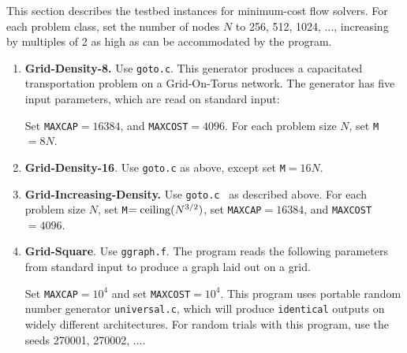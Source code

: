 This section describes the testbed instances for minimum-cost flow
solvers.   
For each problem class, set the number 
of nodes $N$ to 256, 512, 1024, $\ldots$, increasing by multiples of 
2 as high as can be accommodated by the program.  

\begin{enumerate} 

\item {\bf Grid-Density-8.}  Use {\tt goto.c}.  
This generator produces a capacitated transportation
problem on a Grid-On-Torus network.  
The generator has five input parameters, which are read on 
standard input: 
Set {\tt MAXCAP}$ = 16384$, and {\tt MAXCOST}$ = 4096$.  
For each problem size $N$, set {\tt M}$ = 8N$. 

\item {\bf Grid-Density-16}.  Use {\tt goto.c} as above, except
set {\tt M}$=16N$.

\item {\bf Grid-Increasing-Density.}  Use {\tt goto.c } as described
above.  For each problem size $N$, set {\tt M}$ = {\rm ceiling}(N^{3/2})$, 
set {\tt MAXCAP}$ = 16384$, and {\tt MAXCOST}$ = 4096$.  

\item {\bf Grid-Square}. Use {\tt ggraph.f}.  The program reads the following
parameters from standard input to produce a graph laid out on a grid. 
Set {\tt MAXCAP}$=10^4$ and set {\tt MAXCOST}$=10^4$.   This program
uses portable random number generator {\tt universal.c}, which will produce
{\tt identical} outputs on widely different architectures.  For 
random trials with this program, use the seeds 270001, 270002, $\ldots$. 


\end{enumerate}
